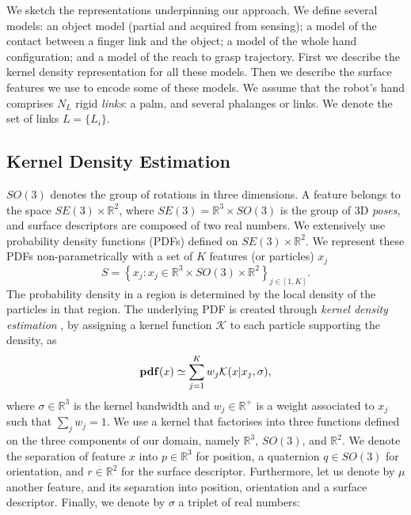 We sketch the representations underpinning our approach. We define several models: an object model (partial and acquired from sensing); a model of the contact between a finger link and the object; a model of the whole hand configuration; and a model of the reach to grasp trajectory. First we describe the kernel density representation for all these models. Then we describe the surface features we use to encode some of these models. We assume that the robot's hand comprises $N_L$ rigid \emph{links}: a palm, and several phalanges or links. We denote the set of links $L =\{L_i\}$.

\subsection{Kernel Density Estimation}
\label{sec:kde}
$SO(3)$ denotes the group of rotations in three dimensions. A feature belongs to the space $SE(3) \times \mathbb R^2$, where $SE(3) = \mathbb R^3 \times SO(3)$ is the group of 3D \emph{poses}, and surface descriptors are composed of two real numbers. We extensively use probability density functions (PDFs) defined on $SE(3) \times \mathbb R^2$.  We represent these PDFs non-parametrically with a set of $K$ features (or particles) $x_j$
\begin{equation}
S = \left\lbrace x_j : x_j \in \mathbb R^3 \times SO(3) \times \mathbb R^2 \right\rbrace_{j \in [1,K]}.
\end{equation}
The probability density in a region is determined by the local density of the particles in that region. The underlying PDF is created through \emph{kernel density estimation} \cite{silverman1986a}, by assigning a kernel function $\mathcal{K}$ to each particle supporting the density, as
\begin{equation}\label{eq:d}
\mathbf{pdf}(x) \simeq \sum_{j=1}^K w_j \mathcal{K}(x| x_{j}, \sigma),
\end{equation}
where  $\sigma \in \mathbb R^3$ is the kernel bandwidth and $w_j \in \mathbb R^{+}$ is a weight associated to $x_j$ such that $\sum_j w_j = 1$. We use a kernel that factorises into three functions defined on the three components of our domain, namely $\mathbb R^3$, $SO(3)$, and $\mathbb R^2$. We denote the separation of feature $x$ into $p \in \mathbb R^3$ for position, a quaternion $q \in SO(3)$ for orientation, and $r \in \mathbb R^2$ for the surface descriptor. Furthermore, let us denote by $\mu$ another feature, and its separation into position, orientation and a surface descriptor. Finally, we denote by $\sigma$ a triplet of real numbers:
